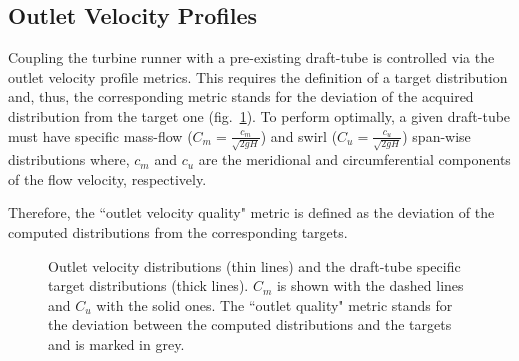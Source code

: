 \subsection{Outlet Velocity Profiles}
Coupling the turbine runner with a pre-existing draft-tube is controlled via the outlet velocity profile metrics. This requires the definition of a target distribution and, thus, the corresponding metric stands for the deviation of the acquired distribution from the target one (fig.\ \ref{design-obj2}). To perform optimally, a given draft-tube must have specific mass-flow ($C_m=\frac{c_m}{\sqrt{2gH}}$) and  swirl ($C_u=\frac{c_u}{\sqrt{2gH}}$) span-wise distributions where, $c_m$ and $c_u$ are the meridional and circumferential components of the flow velocity, respectively.


Therefore, the  ``outlet velocity quality" metric is defined as the deviation of the computed distributions from the corresponding targets. 

\begin{figure}[h!]
\begin{minipage}[b]{1\linewidth}
 \centering
\end{minipage}
\caption{Outlet velocity distributions (thin lines) and the draft-tube specific target distributions (thick lines). $C_m$ is shown with the dashed lines and $C_u$ with the solid ones. The ``outlet quality" metric stands for the deviation between the computed distributions and the targets and is marked in grey.}
\label{design-obj2}
\end{figure}


